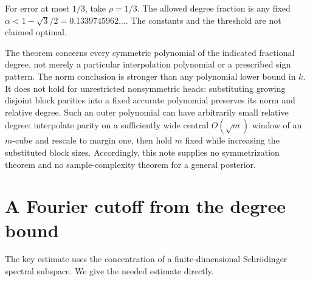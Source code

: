\documentclass[11pt]{article}
\theoremstyle{remark}\newtheorem{remark}[theorem]{Remark}
\begin{document}
For error at most $1/3$, take $\rho=1/3$. The allowed degree fraction
is any fixed $\alpha<1-\sqrt3/2=0.1339745962\ldots$.
The constants and the threshold are not claimed optimal.

The theorem concerns every symmetric polynomial of the indicated
fractional degree, not merely a particular interpolation polynomial or
a prescribed sign pattern. The norm conclusion is stronger than any
polynomial lower bound in $k$. It does not hold for unrestricted
nonsymmetric heads: substituting growing disjoint block parities into
a fixed accurate polynomial preserves its norm and relative degree.
Such an outer polynomial can have arbitrarily small relative degree:
interpolate parity on a sufficiently wide central $O(\sqrt m)$ window
of an $m$-cube and rescale to margin one, then hold $m$ fixed while
increasing the substituted block sizes.
Accordingly, this note supplies no symmetrization theorem and no
sample-complexity theorem for a general posterior.

\section{A Fourier cutoff from the degree bound}
The key estimate uses the concentration of a finite-dimensional
Schr\"odinger spectral subspace. We give the needed estimate directly.
\end{document}
